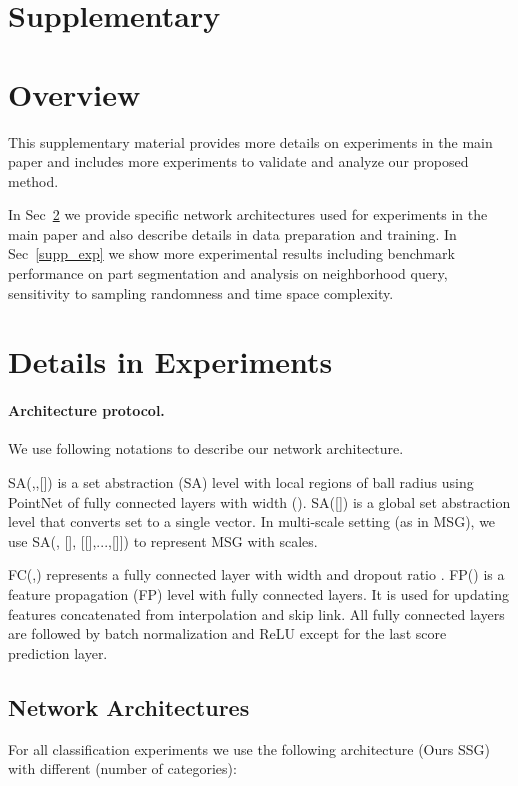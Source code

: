 \documentclass{article}
\begin{document}
\section*{Supplementary}

\section{Overview}
This supplementary material provides more details on experiments in the main paper and includes more experiments to validate and analyze our proposed method.

In Sec~\ref{supp_details} we provide specific network architectures used for experiments in the main paper and also describe details in data preparation and training. In Sec~\ref{supp_exp} we show more experimental results including benchmark performance on part segmentation and analysis on neighborhood query, sensitivity to sampling randomness and time space complexity.

\section{Details in Experiments}
\label{supp_details}
\paragraph{Architecture protocol.}
We use following notations to describe our network architecture.

SA(,,[]) is a set abstraction (SA) level with  local regions of ball radius  using PointNet of  fully connected layers with width  (). SA([]) is a global set abstraction level that converts set to a single vector. In multi-scale setting (as in MSG), we use SA(, [], [[],...,[]]) to represent MSG with  scales.

FC(,) represents a fully connected layer with width  and dropout ratio . FP() is a feature propagation (FP) level with  fully connected layers. It is used for updating features concatenated from interpolation and skip link. All fully connected layers are followed by batch normalization and ReLU except for the last score prediction layer.

\subsection{Network Architectures}
For all classification experiments we use the following architecture (Ours SSG) with different  (number of categories):
\end{document}
